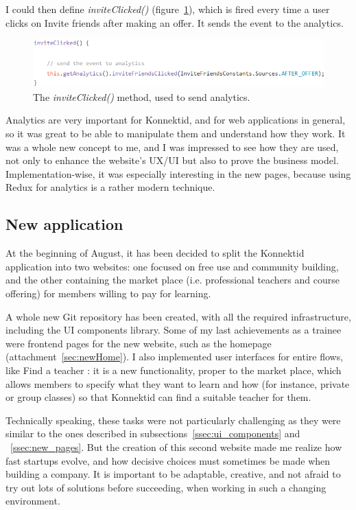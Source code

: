I could then define \textit{inviteClicked()} ({\sc figure}~\ref{fig:inviteClicked}), which is fired every time a user clicks on Invite friends after making an offer. It sends the event to the analytics.

\begin{figure}[H]
    \centering
    \includegraphics[scale=0.9]{figure/inviteClicked.png}
    \caption{The \textit{inviteClicked()} method, used to send analytics.}
    \label{fig:inviteClicked}
\end{figure}

Analytics are very important for Konnektid, and for web applications in general, so it was great to be able to manipulate them and understand how they work. It was a whole new concept to me, and I was impressed to see how they are used, not only to enhance the website's UX/UI but also to prove the business model. Implementation-wise, it was especially interesting in the new pages, because using Redux for analytics is a rather modern technique.

\subsection{New application}
\label{ssec:newApp}

At the beginning of August, it has been decided to split the Konnektid application into two websites: one focused on free use and community building, and the other containing the market place (i.e. professional teachers and course offering) for members willing to pay for learning.

A whole new Git repository has been created, with all the required infrastructure, including the UI components library. Some of my last achievements as a trainee were frontend pages for the new website, such as the homepage ({\sc attachment}~\ref{sec:newHome}). I also implemented user interfaces for entire flows, like \guillemotleft{} Find a teacher \guillemotright{}: it is a new functionality, proper to the market place, which allows members to specify what they want to learn and how (for instance, private or group classes) so that Konnektid can find a suitable teacher for them.

Technically speaking, these tasks were not particularly challenging as they were similar to the ones described in {\sc subsections}~\ref{ssec:ui_components} and ~\ref{ssec:new_pages}. But the creation of this second website made me realize how fast startups evolve, and how decisive choices must sometimes be made when building a company. It is important to be adaptable, creative, and not afraid to try out lots of solutions before succeeding, when working in such a changing environment.
